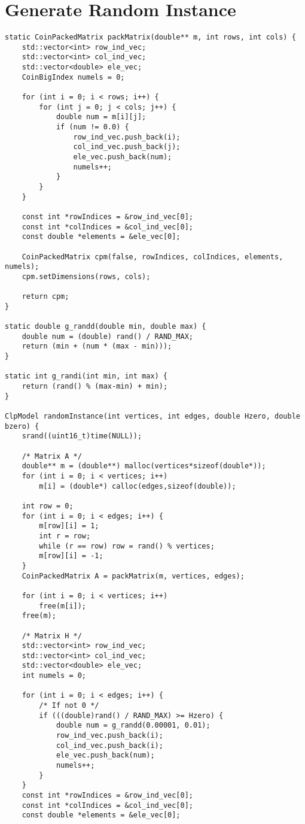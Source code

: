 \section{Generate Random Instance}
\label{app:random}
\begin{verbatim}
static CoinPackedMatrix packMatrix(double** m, int rows, int cols) {
    std::vector<int> row_ind_vec;
    std::vector<int> col_ind_vec;
    std::vector<double> ele_vec;
    CoinBigIndex numels = 0;

    for (int i = 0; i < rows; i++) {
        for (int j = 0; j < cols; j++) {
            double num = m[i][j];
            if (num != 0.0) {
                row_ind_vec.push_back(i);
                col_ind_vec.push_back(j);
                ele_vec.push_back(num);
                numels++;
            }   
        }   
    }   

    const int *rowIndices = &row_ind_vec[0];
    const int *colIndices = &col_ind_vec[0];
    const double *elements = &ele_vec[0];

    CoinPackedMatrix cpm(false, rowIndices, colIndices, elements, numels);
    cpm.setDimensions(rows, cols);

    return cpm;
}

static double g_randd(double min, double max) {
    double num = (double) rand() / RAND_MAX;
    return (min + (num * (max - min)));
}

static int g_randi(int min, int max) {
    return (rand() % (max-min) + min);
}

ClpModel randomInstance(int vertices, int edges, double Hzero, double bzero) {
    srand((uint16_t)time(NULL));

    /* Matrix A */
    double** m = (double**) malloc(vertices*sizeof(double*));
    for (int i = 0; i < vertices; i++)
        m[i] = (double*) calloc(edges,sizeof(double));

    int row = 0;
    for (int i = 0; i < edges; i++) {
        m[row][i] = 1;
        int r = row;
        while (r == row) row = rand() % vertices;
        m[row][i] = -1;
    }
    CoinPackedMatrix A = packMatrix(m, vertices, edges);

    for (int i = 0; i < vertices; i++)
        free(m[i]);
    free(m);

    /* Matrix H */
    std::vector<int> row_ind_vec;
    std::vector<int> col_ind_vec;
    std::vector<double> ele_vec;
    int numels = 0;

    for (int i = 0; i < edges; i++) {
        /* If not 0 */
        if (((double)rand() / RAND_MAX) >= Hzero) {
            double num = g_randd(0.00001, 0.01);
            row_ind_vec.push_back(i);
            col_ind_vec.push_back(i);
            ele_vec.push_back(num);
            numels++;
        }
    }
    const int *rowIndices = &row_ind_vec[0];
    const int *colIndices = &col_ind_vec[0];
    const double *elements = &ele_vec[0];


\end{verbatim}
